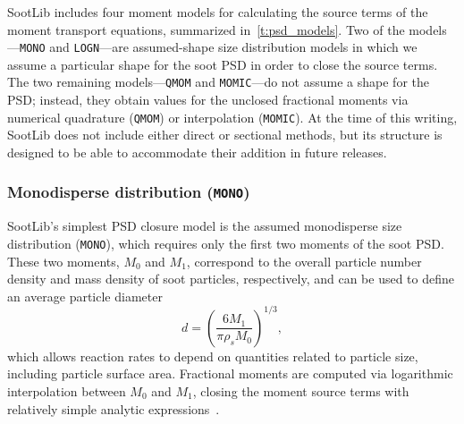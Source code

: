 \documentclass[preprint,letterpaper]{elsarticle}
\begin{document}
SootLib includes four moment models for calculating the source terms of the moment transport equations, summarized in~\ref{t:psd_models}. Two of the models---\texttt{MONO} and \texttt{LOGN}---are assumed-shape size distribution models in which we assume a particular shape for the soot PSD in order to close the source terms. The two remaining models---\texttt{QMOM} and \texttt{MOMIC}---do not assume a shape for the PSD; instead, they obtain values for the unclosed fractional moments via numerical quadrature (\texttt{QMOM}) or interpolation (\texttt{MOMIC}). At the time of this writing, SootLib does not include either direct or sectional methods, but its structure is designed to be able to accommodate their addition in future releases.

\begin{table}
    \caption{Summary of soot particle size distribution models implemented in SootLib.}
    \label{t:psd_models}
    \centering
\end{table}

\subsubsection{Monodisperse distribution (\texttt{MONO})}
\label{sss:mono}

SootLib's simplest PSD closure model is the assumed monodisperse size distribution (\texttt{MONO}), which requires only the first two moments of the soot PSD. These two moments, $M_0$ and $M_1$, correspond to the overall particle number density and mass density of soot particles, respectively, and can be used to define an average particle diameter
\begin{equation}
    d = \left( \frac{6M_1}{\pi \rho_s M_0} \right)^{1/3},
\end{equation}
which allows reaction rates to depend on quantities related to particle size, including particle surface area. Fractional moments are computed via logarithmic interpolation between $M_0$ and $M_1$, closing the moment source terms with relatively simple analytic expressions~\cite{Lignell_2008b}.
\end{document}
